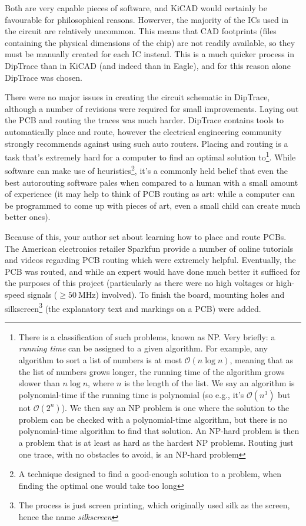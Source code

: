 Both are very capable pieces of software, and KiCAD would certainly be
favourable for philosophical reasons. Howerver, the majority of the ICs used in
the circuit are relatively uncommon. This means that CAD footprints (files
containing the physical dimensions of the chip) are not readily available, so
they must be manually created for each IC instead. This is a much quicker
process in DipTrace than in KiCAD (and indeed than in Eagle), and for this
reason alone DipTrace was chosen.

There were no major issues in creating the circuit schematic in DipTrace,
although a number of revisions were required for small improvements. Laying out
the PCB and routing the traces was much harder. DipTrace contains tools to
automatically place and route, however the electrical engineering community
strongly recommends against using such auto routers. Placing and routing is a task
that's extremely hard for a computer to find an optimal solution
to\footnote{There is a classification of such problems, known as NP. Very
  briefly: a \textit{running time} can be assigned to a given algorithm. For
  example, any algorithm to sort a list of numbers is at most
  $\mathcal{O}\left(n\log{n}\right)$, meaning that as the list of numbers grows
  longer, the running time of the algorithm grows slower than $n\log{n}$, where
  $n$ is the length of the list. We say an algorithm is polynomial-time if the
  running time is polynomial (so e.g., it's $\mathcal{O}\left(n^3\right)$ but
  not $\mathcal{O}\left(2^n\right)$). We then say an NP problem is one where the
  solution to the problem can be checked with a polynomial-time algorithm, but
  there is no polynomial-time algorithm to find that solution. An NP-hard
problem is then a problem that is at least as hard as the hardest NP problems.
Routing just one trace, with no obstacles to avoid, is an NP-hard problem}.
While software can make use of heuristics\footnote{A technique designed to find
a good-enough solution to a problem, when finding the optimal one would take too
long}, it's a commonly held belief that even the best autorouting software pales
when compared to a human with a small amount of experience (it may help to think
of PCB routing as art: while a computer can be programmed to come up with pieces
of art, even a small child can create much better ones).

Because of this, your author set about learning how to place and route PCBs. The
American electronics retailer Sparkfun provide a number of online tutorials and
videos regarding PCB routing which were extremely helpful. Eventually, the PCB
was routed, and while an expert would have done much better it sufficed for the
purposes of this project (particularly as there were no high voltages or
high-speed signals ($\ge\SI{50}{\MHz}$) involved). To finish the board, mounting
holes and silkscreen\footnote{The process is just screen printing, which
originally used silk as the screen, hence the name \textit{silkscreen}} (the
explanatory text and markings on a PCB) were added.


